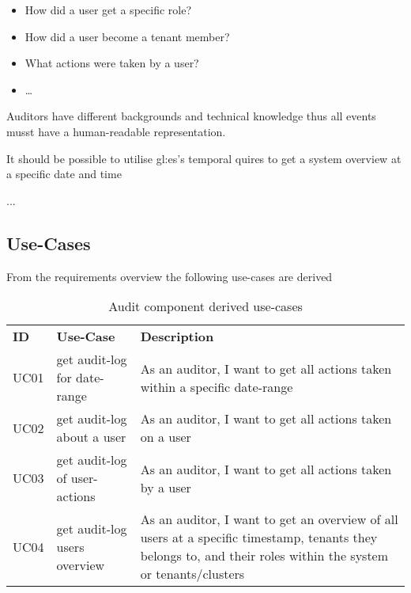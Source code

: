 \begin{itemize}
  \item How did a user get a specific role?
  \item How did a user become a tenant member?
  \item What actions were taken by a user?
  \item \dots
\end{itemize}

Auditors have different backgrounds and technical knowledge thus all events musst have a human-readable representation.

It should be possible to utilise \gls{gl:es}'s temporal quires  to get a system overview at a specific date and time 

...~\citep{SAIP}

\subsection{Use-Cases}

From the requirements overview the following use-cases are derived

\begin{table}[H]
  \begin{center}
    \caption{Audit component derived use-cases}
    \label{tab:acuc}
    \def\arraystretch{1.5}
    \begin{tabularx}{\linewidth}{|l l X |}
      \hline
      \rowcolor{gray!20}
      \textbf{ID} & \textbf{Use-Case} & \textbf{Description}\\
      UC01 & get audit-log for date-range & As an auditor, I want to get all actions taken within a specific date-range\\
      UC02 & get audit-log about a user & As an auditor, I want to get all actions taken on a user\\
      UC03 & get audit-log of user-actions & As an auditor, I want to get all actions taken by a user\\
      UC04 & get audit-log users overview & As an auditor, I want to get an overview of all users at a specific timestamp, tenants they belongs to, and their roles within the system or tenants/clusters\\
      \hline
    \end{tabularx}
  \end{center}
\end{table}


